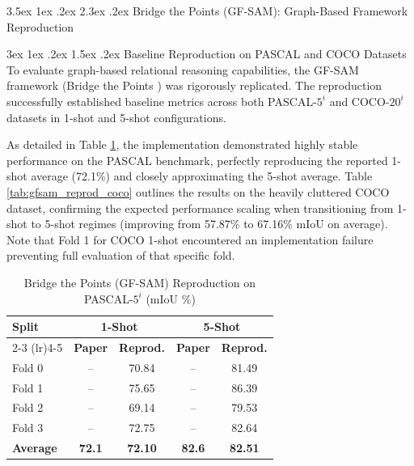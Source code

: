 \documentclass[journal,12pt,onecolumn,draftclsnofoot]{IEEEtran}
\makeatletter
\renewcommand{\section}{\@startsection{section}{1}{\z@}%
    {3.5ex \@plus 1ex \@minus .2ex}%
    {2.3ex \@plus.2ex}%
    {\normalfont\Large\bfseries}}
\renewcommand{\subsection}{\@startsection{subsection}{2}{\z@}%
    {3ex \@plus 1ex \@minus .2ex}%
    {1.5ex \@plus.2ex}%
    {\normalfont\large\bfseries}}
\makeatother
\begin{document}
\newpage


\section{Bridge the Points (GF-SAM): Graph-Based Framework Reproduction \cite{zhang2024bridge}}

\subsection{Baseline Reproduction on PASCAL and COCO Datasets}
To evaluate graph-based relational reasoning capabilities, the GF-SAM framework (Bridge the Points \cite{zhang2024bridge}) was rigorously replicated. The reproduction successfully established baseline metrics across both PASCAL-$5^i$ and COCO-$20^i$ datasets in 1-shot and 5-shot configurations. 

As detailed in Table \ref{tab:gfsam_reprod_pascal}, the implementation demonstrated highly stable performance on the PASCAL benchmark, perfectly reproducing the reported 1-shot average (72.1\%) and closely approximating the 5-shot average. Table \ref{tab:gfsam_reprod_coco} outlines the results on the heavily cluttered COCO dataset, confirming the expected performance scaling when transitioning from 1-shot to 5-shot regimes (improving from 57.87\% to 67.16\% mIoU on average). Note that Fold 1 for COCO 1-shot encountered an implementation failure preventing full evaluation of that specific fold.

\begin{table}[htbp]
\centering
\caption{Bridge the Points (GF-SAM) Reproduction on PASCAL-$5^i$ (mIoU \%)}
\label{tab:gfsam_reprod_pascal}
\begin{tabular}{l c c c c}
\toprule
\multirow{2}{*}{\textbf{Split}} & \multicolumn{2}{c}{\textbf{1-Shot}} & \multicolumn{2}{c}{\textbf{5-Shot}} \\
\cmidrule(lr){2-3} \cmidrule(lr){4-5}
& \textbf{Paper} & \textbf{Reprod.} & \textbf{Paper} & \textbf{Reprod.} \\
\midrule
Fold 0 & -- & 70.84 & -- & 81.49 \\
Fold 1 & -- & 75.65 & -- & 86.39 \\
Fold 2 & -- & 69.14 & -- & 79.53 \\
Fold 3 & -- & 72.75 & -- & 82.64 \\
\midrule
\textbf{Average} & \textbf{72.1} & \textbf{72.10} & \textbf{82.6} & \textbf{82.51} \\
\bottomrule
\end{tabular}
\end{table}
\end{document}
